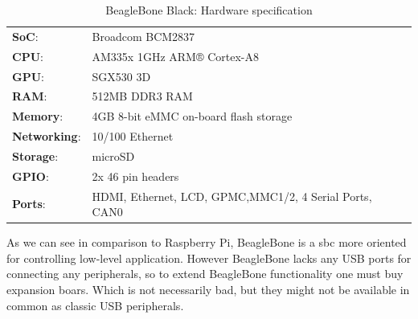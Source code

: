 \begin{table}[H]
 \begin{center}
   \begin{tabular}{l l}
   \hline
   	\textbf{SoC}: & Broadcom BCM2837\\
	\textbf{CPU}: & AM335x 1GHz ARM® Cortex-A8\\
	\textbf{GPU}: & SGX530 3D\\
	\textbf{RAM}: & 512MB DDR3 RAM\\
	\textbf{Memory}:& 4GB 8-bit eMMC on-board flash storage \\
	\textbf{Networking}: & 10/100 Ethernet\\
	\textbf{Storage}: & microSD\\
	\textbf{GPIO}: & 2x 46 pin headers\\
	\textbf{Ports}: & HDMI, Ethernet, LCD, GPMC,MMC1/2, 4 Serial Ports, CAN0 \\
   \hline
   \end{tabular}
 \end{center}
 \caption{BeagleBone Black: Hardware specification}
 \label{tab:tab2}
\end{table}
As we can see in comparison to Raspberry Pi, BeagleBone is a \gls{sbc} more oriented for controlling low-level application. However BeagleBone lacks any USB ports for connecting any peripherals, so to extend BeagleBone functionality one must buy expansion boars. Which is not necessarily bad, but they might not be available in common as classic USB peripherals.
